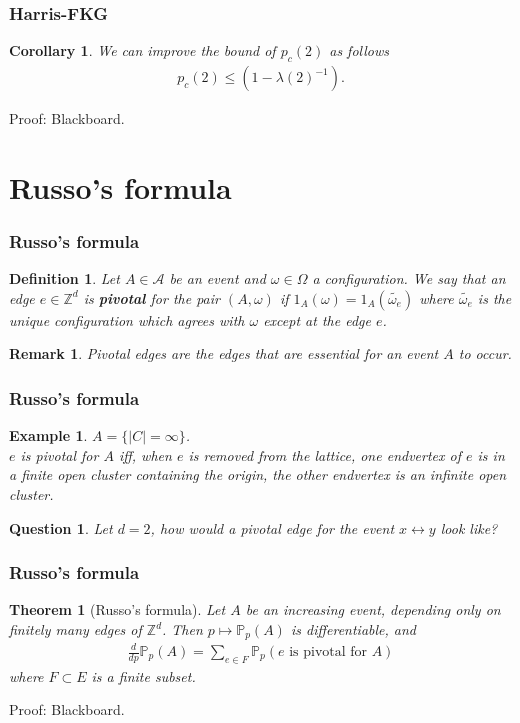 \documentclass[compress,mathserif,serif]{beamer}
\newtheorem{thm}{Theorem}
\newtheorem{Cor}{Corollary}
\newtheorem{question}{Question}
\newtheorem{dfn}{Definition}
\newtheorem{rem}{Remark}
\newtheorem{exm}{Example}
\begin{document}
\begin{frame}
\frametitle{Harris-FKG}
\begin{Cor} We can improve the bound of $p_c(2)$ as follows
\begin{align*}
p_c(2) \leq (1-\lambda(2)^{-1}).
\end{align*}
\end{Cor}
Proof: Blackboard.
\end{frame}

\section{Russo's formula}


\begin{frame}
\begin{center}
\Huge{}
\end{center}
\end{frame}


\begin{frame}
\frametitle{Russo's formula}
\begin{dfn}Let $A \in \mathcal{A}$ be an event and $\omega \in \Omega$ a configuration. We say that an edge $e \in \mathbb{Z}^d$ is \textbf{pivotal} for the pair $(A, \omega)$ if $1_A(\omega)= 1_A( \widetilde{\omega_e})$ where $\widetilde{\omega_e}$ is the unique configuration which agrees with $\omega$ except at the edge $e$. 
\end{dfn}
\pause
\begin{rem} Pivotal edges are the edges that are essential for an event $A$ to occur. 
\end{rem}
\end{frame}

\begin{frame}
\frametitle{Russo's formula}
\begin{exm} $A=\{|C|= \infty\}$.
\pause
\\
$e$ is pivotal for $A$ iff, when $e$ is removed from the lattice, one endvertex of $e$ is in a finite open cluster containing the origin, the other endvertex is an infinite open cluster.
\end{exm}
\pause
\begin{question} Let $d=2$, how would a pivotal edge for the event $x \longleftrightarrow y$ look like? 
\end{question}
\end{frame}

\begin{frame}
\frametitle{Russo's formula}
\begin{thm}[Russo's formula] Let $A$ be an increasing event, depending only on finitely many edges of $\mathbb{Z}^d$. Then $p \mapsto \mathbb{P}_p(A)$ is differentiable, and 
\begin{align*}
\frac{d}{dp}\mathbb{P}_p(A) = \sum_{e \in F} \mathbb{P}_p(e \text{ is pivotal for } A)
\end{align*}
where $F \subset E$ is a finite subset.
\end{thm}
Proof: Blackboard.
\end{frame}
\end{document}
